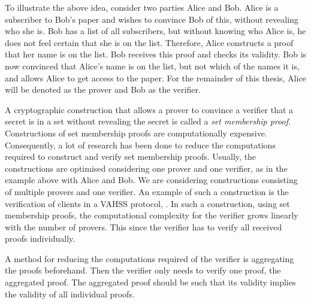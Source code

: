 
To illustrate the above idea, consider two parties Alice and Bob. Alice is a subscriber to Bob's paper and wishes to convince Bob of this, without revealing who she is. Bob has a list of all subscribers, but without knowing who Alice is, he does not feel certain that she is on the list. Therefore, Alice constructs a proof that her name is on the list. Bob receives this proof and checks its validity. Bob is now convinced that Alice's name is on the list, but not which of the names it is, and allows Alice to get access to the paper.  For the remainder of this thesis, Alice will be denoted as the prover and Bob as the verifier.

A cryptographic construction that allows a prover to convince a verifier that a secret is in a set without revealing the secret is called a \textit{set membership proof}.  %
Constructions of set membership proofs are computationally expensive. Consequently, a lot of research has been done to reduce the computations required to construct and verify set membership proofs. Usually, the constructions are optimised considering one prover and one verifier, as in the example above with Alice and Bob. We are considering constructions consisting of multiple provers and one verifier. An example of such a construction is the verification of clients in a VAHSS protocol, \cite{SumItUp}. In such a construction, using set membership proofs, the computational complexity for the verifier grows linearly with the number of provers. This since the verifier has to verify all received proofs individually.  

A method for reducing the computations required of the verifier is aggregating the proofs beforehand. Then the verifier only needs to verify one proof, the aggregated proof. The aggregated proof should be such that its validity implies the validity of all individual proofs.

